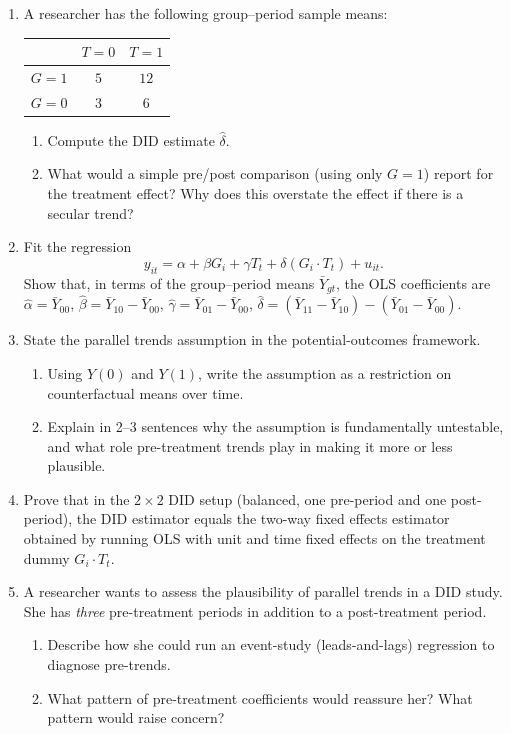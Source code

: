 \documentclass{article}
\begin{document}
\begin{enumerate}[label=\textbf{B.\arabic*},leftmargin=*,itemsep=10pt]

\item  A researcher has the following group--period sample means:
\begin{center}
\begin{tabular}{c|cc}
      & $T = 0$ & $T = 1$ \\
\hline
$G = 1$ & $5$ & $12$ \\
$G = 0$ & $3$ & $6$
\end{tabular}
\end{center}
\begin{enumerate}[label=(\alph*)]
  \item Compute the DID estimate $\hat\delta$.
  \item What would a simple pre/post comparison (using only $G = 1$) report for the treatment effect?  Why does this overstate the effect if there is a secular trend?
\end{enumerate}

\item  Fit the regression
$$y_{it} = \alpha + \beta G_i + \gamma T_t + \delta (G_i\cdot T_t) + u_{it}.$$
Show that, in terms of the group--period means $\bar Y_{gt}$, the OLS coefficients are $\hat\alpha = \bar Y_{00}$, $\hat\beta = \bar Y_{10} - \bar Y_{00}$, $\hat\gamma = \bar Y_{01} - \bar Y_{00}$, $\hat\delta = (\bar Y_{11} - \bar Y_{10}) - (\bar Y_{01} - \bar Y_{00})$.

\item  State the parallel trends assumption in the potential-outcomes framework.
\begin{enumerate}[label=(\alph*)]
  \item Using $Y(0)$ and $Y(1)$, write the assumption as a restriction on counterfactual means over time.
  \item Explain in 2--3 sentences why the assumption is fundamentally untestable, and what role pre-treatment trends play in making it more or less plausible.
\end{enumerate}

\item  Prove that in the $2\times 2$ DID setup (balanced, one pre-period and one post-period), the DID estimator equals the two-way fixed effects estimator obtained by running OLS with unit and time fixed effects on the treatment dummy $G_i\cdot T_t$.

\item  A researcher wants to assess the plausibility of parallel trends in a DID study.  She has \emph{three} pre-treatment periods in addition to a post-treatment period.
\begin{enumerate}[label=(\alph*)]
  \item Describe how she could run an event-study (leads-and-lags) regression to diagnose pre-trends.
  \item What pattern of pre-treatment coefficients would reassure her?  What pattern would raise concern?
\end{enumerate}

\end{enumerate}
\end{document}
